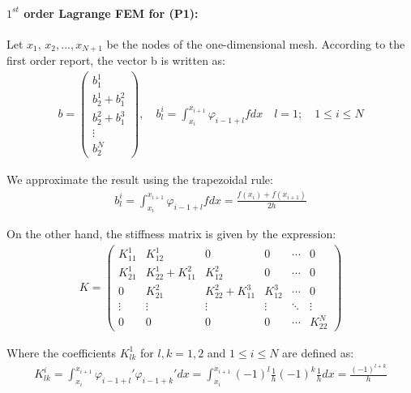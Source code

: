 \documentclass{article}
\begin{document}
\paragraph{$1^{st}$ order Lagrange FEM for (P1):}
\noindent Let $x_1, \, x_2,...,x_{N+1}$ be the nodes of the one-dimensional mesh. According to the first order report, the vector b is written as:
\begin{gather*}
    b=\begin{pmatrix}
        b_1^1\\b_2^1+b_1^2\\b_2^2+b_1^3\\ \vdots \\ b_2^N
    \end{pmatrix}, \quad b^i_{l}=\int_{x_i}^{x_{i+1}} \varphi_{i-1+l} f dx \quad
     l=1; \quad 1\leq i \leq N
\end{gather*}

\noindent We approximate the result using the trapezoidal rule:
\begin{gather*}
    b^i_{l}=\int_{x_i}^{x_{i+1}} \varphi_{i-1+l} f dx=\frac{f(x_i)+f(x_{i+1})}{2h}
\end{gather*}

\noindent On the other hand, the stiffness matrix is given by the expression:
\begin{gather*}
    K=\begin{pmatrix}
        K_{11}^1 & K_{12}^1 & 0 & 0 & \cdots & 0\\
        K_{21}^1 & K_{22}^1+K_{11}^2 & K_{12}^2 & 0 & \cdots & 0\\ 
        0 & K_{21}^2 & K_{22}^2+K_{11}^3 & K_{12}^3 & \cdots & 0\\
        \vdots & \vdots & \vdots & \vdots & \ddots & \vdots\\
        0 & 0 & 0 & 0 & \cdots & K_{22}^N
    \end{pmatrix}
\end{gather*}

\noindent Where the coefficients $K_{lk}^1$ for $l,k=1,2$ and $1\leq i \leq N$ are defined as:
\begin{gather*}
    K^i_{lk}=\int_{x_i}^{x_{i+1}} \varphi_{i-1+l}' \varphi_{i-1+k}' dx= \int_{x_i}^{x_{i+1}} (-1)^l\frac{1}{h}(-1)^k\frac{1}{h}dx=\frac{(-1)^{l+k}}{h}
\end{gather*}
\end{document}
